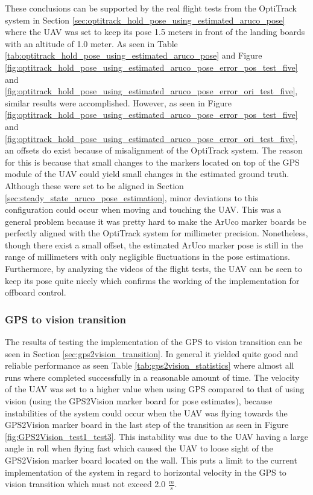 \documentclass[../Head/report.tex]{subfiles}
\begin{document}
These conclusions can be supported by the real flight tests from the OptiTrack system in Section \ref{sec:optitrack_hold_pose_using_estimated_aruco_pose} where the UAV was set to keep its pose 1.5 meters in front of the landing boards with an altitude of 1.0 meter. As seen in Table \ref{tab:optitrack_hold_pose_using_estimated_aruco_pose} and Figure \ref{fig:optitrack_hold_pose_using_estimated_aruco_pose_error_pos_test_five} and \ref{fig:optitrack_hold_pose_using_estimated_aruco_pose_error_ori_test_five},  similar results were accomplished. However, as seen in Figure \ref{fig:optitrack_hold_pose_using_estimated_aruco_pose_error_pos_test_five} and \ref{fig:optitrack_hold_pose_using_estimated_aruco_pose_error_ori_test_five}, an offsets do exist because of misalignment of the OptiTrack system. The reason for this is because that small changes to the markers located on top of the GPS module of the UAV could yield small changes in the estimated ground truth. Although these were set to be aligned in Section \ref{sec:steady_state_aruco_pose_estimation}, minor deviations to this configuration could occur when moving and touching the UAV. This was a general problem because it was pretty hard to make the ArUco marker boards be perfectly aligned with the OptiTrack system for millimeter precision. Nonetheless, though there exist a small offset, the estimated ArUco marker pose is still in the range of millimeters with only negligible fluctuations in the pose estimations. Furthermore, by analyzing the videos of the flight tests, the UAV can be seen to keep its pose quite nicely which confirms the working of the implementation for offboard control. 

\subsubsection*{GPS to vision transition}
The results of testing the implementation of the GPS to vision transition can be seen in Section \ref{sec:gps2vision_transition}. In general it yielded quite good and reliable performance as seen Table \ref{tab:gps2vision_statistics} where almost all runs where completed successfully in a reasonable amount of time. The velocity of the UAV was set to a higher value when using GPS compared to that of using vision (using the GPS2Vision marker board for pose estimates), because instabilities of the system could occur when the UAV was flying towards the GPS2Vision marker board in the last step of the transition as seen in Figure \ref{fig:GPS2Vision_test1_test3}. This instability was due to the UAV having a large angle in roll when flying fast which caused the UAV to loose sight of the GPS2Vision marker board located on the wall. This puts a limit to the current implementation of the system in regard to horizontal velocity in the GPS to vision transition which must not exceed 2.0 $\frac{m}{s}$. 
\end{document}
